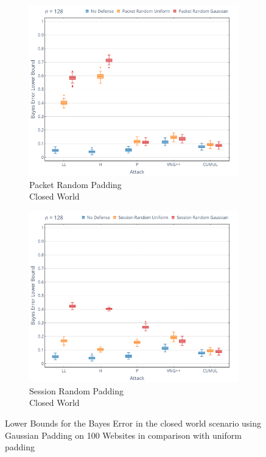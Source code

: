 \documentclass[
	ruledheaders=chapter,
	class=report,
	thesis={type=master, department=inf},
	accentcolor=1c,
	custommargins=true,
	marginpar=false,
	parskip=half-,
	fontsize=11pt,
]{tudapub}
\begin{document}
	\begin{figure}[tbp]
		\begin{subfigure}{0.495\textwidth}
			\centering
			\includegraphics[width=\textwidth]{plots/bounds_cw_pkt.png}
			\caption{Packet Random Padding\\Closed World}
		\end{subfigure}
		\hfill
		\begin{subfigure}{0.495\textwidth}
			\centering
			\includegraphics[width=\textwidth]{plots/bounds_cw_ses.png}
			\caption{Session Random Padding\\Closed World}
		\end{subfigure}
		\caption[Lower Bounds for the Bayes Error in the closed world scenario]{Lower Bounds for the Bayes Error in the closed world scenario using Gaussian Padding on 100 Websites in comparison with uniform padding}
		\label{fig:bound_cw}
	\end{figure}
\end{document}
